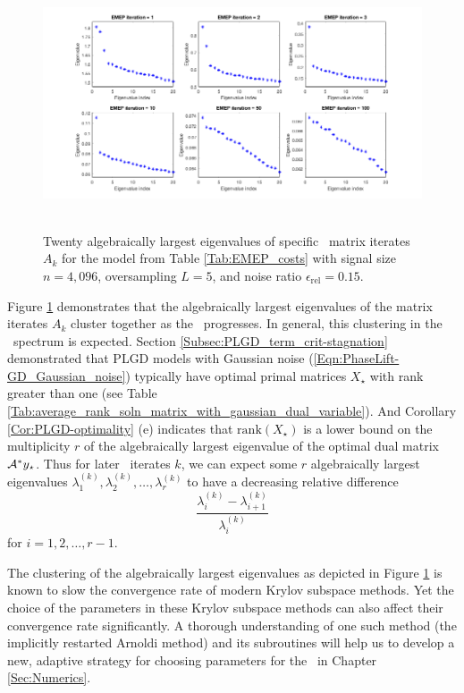 \begin{figure}[H]
\centering
\hbox{\hspace{-1.9cm} \includegraphics[scale=0.6]{EMEP_largest_eigvals} }\vspace{-0.4cm}
	\caption{Twenty algebraically largest eigenvalues of specific \emep \ matrix iterates $A_k$ for the model from Table \ref{Tab:EMEP_costs} with signal size $n = 4,096$, oversampling $L = 5$, and noise ratio $\epsilon_\text{rel} = 0.15$.}
\label{Fig:EMEP_largest_eigvals}
\end{figure}

Figure \ref{Fig:EMEP_largest_eigvals} demonstrates that the algebraically largest eigenvalues of the matrix iterates $A_k$ cluster together as the \emep \ progresses.  
In general, this clustering in the \emep \ spectrum is expected.  
Section \ref{Subsec:PLGD_term_crit-stagnation} demonstrated that PLGD models with Gaussian noise (\ref{Eqn:PhaseLift-GD_Gaussian_noise}) typically have optimal primal matrices $X_\star$ with rank greater than one (see Table \ref{Tab:average_rank_soln_matrix_with_gaussian_dual_variable}).
And Corollary \ref{Cor:PLGD-optimality} (e) indicates that $\text{rank}(X_\star)$ is a lower bound on the multiplicity $r$ of the algebraically largest eigenvalue of the optimal dual matrix ${\mathcal A}^*y_\star$.
Thus for later \emep \ iterates $k$, we can expect some $r$ algebraically largest eigenvalues $\lambda_1^{(k)}, \lambda_2^{(k)}, \ldots, \lambda_r^{(k)}$ to have a decreasing relative difference
\[
\frac{\lambda_i^{(k)} - \lambda_{i+1}^{(k)}}
	{\lambda_i^{(k)}}
\]
for $i = 1, 2, \ldots, r-1$.



The clustering of the algebraically largest eigenvalues as depicted in Figure \ref{Fig:EMEP_largest_eigvals} is known to slow the convergence rate of modern Krylov subspace methods.
Yet the choice of the parameters in these Krylov subspace methods can also affect their convergence rate significantly.
A thorough understanding of one such method (the implicitly restarted Arnoldi method) and its subroutines will help us to develop a new, adaptive strategy for choosing parameters for the \emep \ in Chapter \ref{Sec:Numerics}.






